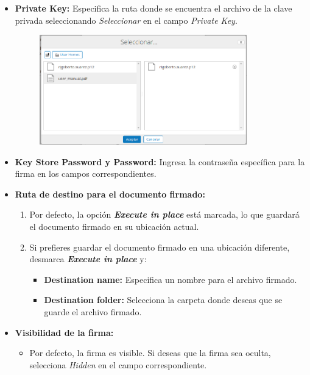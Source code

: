 \documentclass{template/ol-softwaremanual}
\begin{document}
\begin{enumerate}
\begin{itemize}
		\item \textbf{Private Key:} Especifica la ruta donde se encuentra el archivo de la clave privada seleccionando \textit{Seleccionar} en el campo \textit{Private Key}.
		\begin{figure}[h]
			\centering
			\includegraphics[width=0.85\textwidth]{images/private-key}
			\label{fig:etiqueta_imagen}
		\end{figure}
		\item \textbf{Key Store Password y Password:} Ingresa la contraseña específica para la firma en los campos correspondientes.
		
		\item \textbf{Ruta de destino para el documento firmado:}
		\begin{enumerate}
			\item Por defecto, la opción \textit{\textbf{Execute in place}} está marcada, lo que guardará el documento firmado en su ubicación actual.
			\item Si prefieres guardar el documento firmado en una ubicación diferente, desmarca \textit{\textbf{Execute in place}} y:
			\begin{itemize}
				\item \textbf{Destination name:} Especifica un nombre para el archivo firmado.
				\item \textbf{Destination folder:} Selecciona la carpeta donde deseas que se guarde el archivo firmado.
			\end{itemize}
		\end{enumerate}
		
		\item \textbf{Visibilidad de la firma:}
		\begin{itemize}
			\item Por defecto, la firma es visible. Si deseas que la firma sea oculta, selecciona \textit{Hidden} en el campo correspondiente.
		\end{itemize}
		

\end{itemize}
\end{enumerate}
\end{document}
